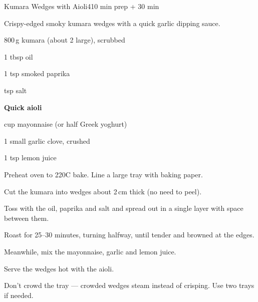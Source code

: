 \begin{recipebox}{Kumara Wedges with Aioli}{4}{10 min prep + 30 min}

Crispy-edged smoky kumara wedges with a quick garlic dipping sauce.

\begin{ingredients}
  \item 800\,g kumara (about 2 large), scrubbed
  \item 1 tbsp oil
  \item 1 tsp smoked paprika
  \item {} tsp salt
  \item[] \textbf{Quick aioli}
  \item {} cup mayonnaise (or half Greek yoghurt)
  \item 1 small garlic clove, crushed
  \item 1 tsp lemon juice
\end{ingredients}

\begin{method}
  \item Preheat oven to 220\degree C bake. Line a large tray with baking paper.
  \item Cut the kumara into wedges about 2\,cm thick (no need to peel).
  \item Toss with the oil, paprika and salt and spread out in a single layer with space between them.
  \item Roast for 25--30 minutes, turning halfway, until tender and browned at the edges.
  \item Meanwhile, mix the mayonnaise, garlic and lemon juice.
  \item Serve the wedges hot with the aioli.
\end{method}

\begin{notelist}
  \item Don't crowd the tray --- crowded wedges steam instead of crisping. Use two trays if needed.
\end{notelist}

\end{recipebox}
